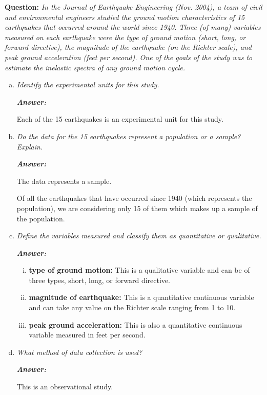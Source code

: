 \documentclass[12pt,letterpaper]{article}
\begin{document}
\textbf{Question:}
\textit{In the Journal of Earthquake Engineering (Nov. 2004), a team of civil and environmental engineers studied the ground motion characteristics of 15 earthquakes that occurred around the world since 1940. Three (of many) variables measured on each earthquake were the type of ground motion (short, long, or forward directive), the magnitude of the earthquake (on the Richter scale), and peak ground acceleration (feet per second). One of the goals of the study was to estimate the inelastic spectra of any ground motion cycle.}

\begin{enumerate}[a.] \setlength{\itemsep}{30pt}
  \item \textit{Identify the experimental units for this study.}

  \textbf{\textit{Answer: }}
  
  Each of the 15 earthquakes is an experimental unit for this study.
  \item \textit{Do the data for the 15 earthquakes represent a population or a sample? Explain.}
  
  \textbf{\textit{Answer: }}
  
  The data represents a sample.
  
  Of all the earthquakes that have occurred since 1940 (which represents the population), we are considering only 15 of them which makes up a sample of the population.
  \item \textit{Define the variables measured and classify them as quantitative or qualitative.}
  
  \textbf{\textit{Answer: }}
  
  \begin{enumerate}[i.]
    \item \textbf{type of ground motion:} This is a qualitative variable and can be of three types, short, long, or forward directive.
    \item \textbf{magnitude of earthquake:} This is a quantitative continuous variable and can take any value on the Richter scale ranging from 1 to 10.
    \item \textbf{peak ground acceleration:} This is also a quantitative continuous variable measured in feet per second.
  \end{enumerate}
  \item \textit{What method of data collection is used?}
  
  \textbf{\textit{Answer: }}

  This is an observational study.

\end{enumerate}
\end{document}
